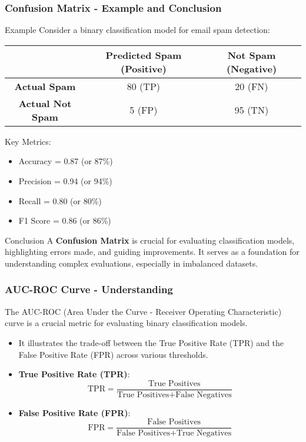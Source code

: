 \documentclass[aspectratio=169]{beamer}
\begin{document}
\begin{frame}[fragile]
  \frametitle{Confusion Matrix - Example and Conclusion}
  
  \begin{block}{Example}
    Consider a binary classification model for email spam detection:
    \begin{center}
    \begin{tabular}{|c|c|c|}
      \hline
      & \textbf{Predicted Spam (Positive)} & \textbf{Not Spam (Negative)} \\
      \hline
      \textbf{Actual Spam} & 80 (TP) & 20 (FN) \\
      \hline
      \textbf{Actual Not Spam} & 5 (FP) & 95 (TN) \\
      \hline
    \end{tabular}
    \end{center}
    
    Key Metrics:
    \begin{itemize}
      \item Accuracy = 0.87 (or 87\%)
      \item Precision = 0.94 (or 94\%)
      \item Recall = 0.80 (or 80\%)
      \item F1 Score = 0.86 (or 86\%)
    \end{itemize}
  \end{block}

  \begin{block}{Conclusion}
    A \textbf{Confusion Matrix} is crucial for evaluating classification models, highlighting errors made, and guiding improvements. 
    It serves as a foundation for understanding complex evaluations, especially in imbalanced datasets.
  \end{block}
\end{frame}

\begin{frame}[fragile]
    \frametitle{AUC-ROC Curve - Understanding}
    The AUC-ROC (Area Under the Curve - Receiver Operating Characteristic) curve is a crucial metric for evaluating binary classification models.
    
    \begin{itemize}
        \item It illustrates the trade-off between the True Positive Rate (TPR) and the False Positive Rate (FPR) across various thresholds.
        \item \textbf{True Positive Rate (TPR)}:
        \begin{equation}
            \text{TPR} = \frac{\text{True Positives}}{\text{True Positives} + \text{False Negatives}}
        \end{equation}
        \item \textbf{False Positive Rate (FPR)}:
        \begin{equation}
            \text{FPR} = \frac{\text{False Positives}}{\text{False Positives} + \text{True Negatives}}
        \end{equation}
    \end{itemize}
\end{frame}
\end{document}
